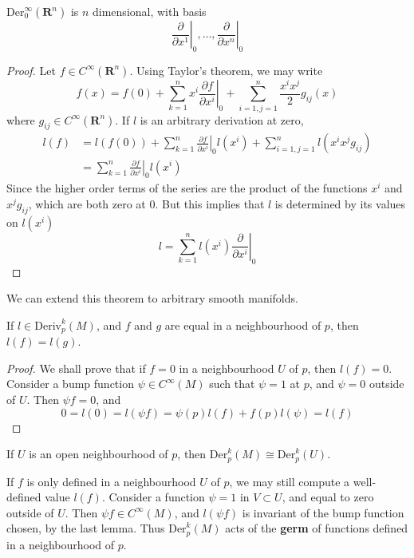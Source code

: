 \begin{theorem}
    $\text{Der}^\infty_0(\mathbf{R}^n)$ is $n$ dimensional, with basis
    \[ \left.\frac{\partial}{\partial x^1}\right|_0, \dots, \left.\frac{\partial}{\partial x^n}\right|_0 \]
\end{theorem}
\begin{proof}
    Let $f \in C^\infty(\mathbf{R}^n)$. Using Taylor's theorem, we may write
    \[ f(x) = f(0) + \sum_{k = 1}^n x^i \left.\frac{\partial f}{\partial x^i}\right|_0 + \sum_{i = 1,j = 1}^n \frac{x^i x^j}{2} g_{ij}(x) \]
    where $g_{ij} \in C^\infty(\mathbf{R}^n)$. If $l$ is an arbitrary derivation at zero,
    \begin{align*}
        l(f) &= l(f(0)) + \sum_{k = 1}^n \left.\frac{\partial f}{\partial x^i}\right|_0 l(x^i) + \sum_{i = 1, j =1}^n l(x^i x^j g_{ij})\\
        &= \sum_{k = 1}^n \left.\frac{\partial f}{\partial x^i}\right|_0 l(x^i)
    \end{align*}
    Since the higher order terms of the series are the product of the functions $x^i$ and $x^j g_{ij}$, which are both zero at $0$. But this implies that $l$ is determined by its values on $l(x^i)$
    \[ l = \sum_{k = 1}^n l(x^i) \left.\frac{\partial}{\partial x^i}\right|_0 \]
\end{proof}

We can extend this theorem to arbitrary smooth manifolds.

\begin{lemma}
    If $l \in \text{Deriv}^k_p(M)$, and $f$ and $g$ are equal in a neighbourhood of $p$, then $l(f) = l(g)$.
\end{lemma}
\begin{proof}
    We shall prove that if $f = 0$ in a neighbourhood $U$ of $p$, then $l(f) = 0$. Consider a bump function $\psi \in C^\infty(M)$ such that $\psi = 1$ at $p$, and $\psi = 0$ outside of $U$. Then $\psi f = 0$, and
    \[ 0 = l(0) = l(\psi f) = \psi(p) l(f) + f(p) l(\psi) = l(f) \]
\end{proof}

\begin{corollary}
    If $U$ is an open neighbourhood of $p$, then $\text{Der}^k_p(M) \cong \text{Der}^k_p(U)$.
\end{corollary}

If $f$ is only defined in a neighbourhood $U$ of $p$, we may still compute a well-defined value $l(f)$. Consider a function $\psi = 1$ in $V \subset U$, and equal to zero outside of $U$. Then $\psi f \in C^\infty(M)$, and $l(\psi f)$ is invariant of the bump function chosen, by the last lemma. Thus $\text{Der}^k_p(M)$ acts of the {\bf germ} of functions defined in a neighbourhood of $p$.

